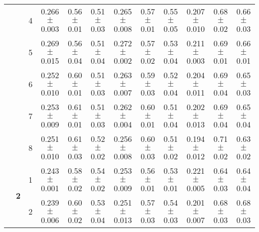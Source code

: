 \begin{table*}
{\begin{tabular}{|l|c|c||c|c|c||c|c|c||c|c|c|}
 & & 4 & \textcolor{gate_color}{0.266$\pm$0.003} & \textcolor{gate_color}{0.56$\pm$0.01} & \textcolor{gate_color}{0.51$\pm$0.03} & \textcolor{mixed_color}{0.265$\pm$0.008} & \textcolor{mixed_color}{0.57$\pm$0.01} & \textcolor{mixed_color}{0.55$\pm$0.05} & \textcolor{pulsed_color}{0.207$\pm$0.010} & \textcolor{pulsed_color}{0.68$\pm$0.02} & \textcolor{pulsed_color}{0.66$\pm$0.03} \\
 & & 5 & \textcolor{gate_color}{0.269$\pm$0.015} & \textcolor{gate_color}{0.56$\pm$0.04} & \textcolor{gate_color}{0.51$\pm$0.04} & \textcolor{mixed_color}{0.272$\pm$0.002} & \textcolor{mixed_color}{0.57$\pm$0.02} & \textcolor{mixed_color}{0.53$\pm$0.04} & \textcolor{pulsed_color}{0.211$\pm$0.003} & \textcolor{pulsed_color}{0.69$\pm$0.01} & \textcolor{pulsed_color}{0.66$\pm$0.01} \\
 & & 6 & \textcolor{gate_color}{0.252$\pm$0.010} & \textcolor{gate_color}{0.60$\pm$0.01} & \textcolor{gate_color}{0.51$\pm$0.03} & \textcolor{mixed_color}{0.263$\pm$0.007} & \textcolor{mixed_color}{0.59$\pm$0.03} & \textcolor{mixed_color}{0.52$\pm$0.04} & \textcolor{pulsed_color}{0.204$\pm$0.011} & \textcolor{pulsed_color}{0.69$\pm$0.04} & \textcolor{pulsed_color}{0.65$\pm$0.03} \\
 & & 7 & \textcolor{gate_color}{0.253$\pm$0.009} & \textcolor{gate_color}{0.61$\pm$0.01} & \textcolor{gate_color}{0.51$\pm$0.03} & \textcolor{mixed_color}{0.262$\pm$0.004} & \textcolor{mixed_color}{0.60$\pm$0.01} & \textcolor{mixed_color}{0.51$\pm$0.04} & \textcolor{pulsed_color}{0.202$\pm$0.013} & \textcolor{pulsed_color}{0.69$\pm$0.04} & \textcolor{pulsed_color}{0.65$\pm$0.04} \\
 & & 8 & \textcolor{gate_color}{0.251$\pm$0.010} & \textcolor{gate_color}{0.61$\pm$0.03} & \textcolor{gate_color}{0.52$\pm$0.02} & \textcolor{mixed_color}{0.256$\pm$0.008} & \textcolor{mixed_color}{0.60$\pm$0.03} & \textcolor{mixed_color}{0.51$\pm$0.02} & \textcolor{pulsed_color}{0.194$\pm$0.012} & \textcolor{pulsed_color}{0.71$\pm$0.02} & \textcolor{pulsed_color}{0.63$\pm$0.02} \\
\cline{2-12}
 & \multirow{8}{*}{\textbf{2}} & 1 & \textcolor{gate_color}{0.243$\pm$0.001} & \textcolor{gate_color}{0.58$\pm$0.02} & \textcolor{gate_color}{0.54$\pm$0.02} & \textcolor{mixed_color}{0.253$\pm$0.009} & \textcolor{mixed_color}{0.56$\pm$0.01} & \textcolor{mixed_color}{0.53$\pm$0.01} & \textcolor{pulsed_color}{0.221$\pm$0.005} & \textcolor{pulsed_color}{0.64$\pm$0.03} & \textcolor{pulsed_color}{0.64$\pm$0.04} \\
 & & 2 & \textcolor{gate_color}{0.239$\pm$0.006} & \textcolor{gate_color}{0.60$\pm$0.02} & \textcolor{gate_color}{0.53$\pm$0.04} & \textcolor{mixed_color}{0.251$\pm$0.013} & \textcolor{mixed_color}{0.57$\pm$0.03} & \textcolor{mixed_color}{0.54$\pm$0.03} & \textcolor{pulsed_color}{0.201$\pm$0.007} & \textcolor{pulsed_color}{0.68$\pm$0.03} & \textcolor{pulsed_color}{0.68$\pm$0.03} \\

\end{tabular}}
\end{table*}
